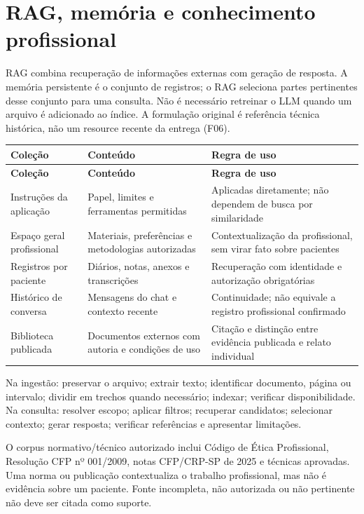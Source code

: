 \documentclass[11pt,a4paper]{article}
\begin{document}
\section{RAG, memória e conhecimento profissional}
RAG combina recuperação de informações externas com geração de resposta. A memória persistente é o conjunto de registros; o RAG seleciona partes pertinentes desse conjunto para uma consulta. Não é necessário retreinar o LLM quando um arquivo é adicionado ao índice. A formulação original é referência técnica histórica, não um resource recente da entrega (F06).

\begingroup\small
\begin{longtable}{>{\raggedright\arraybackslash}p{}>{\raggedright\arraybackslash}p{}>{\raggedright\arraybackslash}p{}}
\toprule
\textbf{Coleção} & \textbf{Conteúdo} & \textbf{Regra de uso} \\ \midrule\endfirsthead
\toprule
\textbf{Coleção} & \textbf{Conteúdo} & \textbf{Regra de uso} \\ \midrule\endhead
\bottomrule\endfoot
Instruções da aplicação & Papel, limites e ferramentas permitidas & Aplicadas diretamente; não dependem de busca por similaridade \\[3pt]
Espaço geral profissional & Materiais, preferências e metodologias autorizadas & Contextualização da profissional, sem virar fato sobre pacientes \\[3pt]
Registros por paciente & Diários, notas, anexos e transcrições & Recuperação com identidade e autorização obrigatórias \\[3pt]
Histórico de conversa & Mensagens do chat e contexto recente & Continuidade; não equivale a registro profissional confirmado \\[3pt]
Biblioteca publicada & Documentos externos com autoria e condições de uso & Citação e distinção entre evidência publicada e relato individual \\[3pt]
\end{longtable}
\endgroup
Na ingestão: preservar o arquivo; extrair texto; identificar documento, página ou intervalo; dividir em trechos quando necessário; indexar; verificar disponibilidade. Na consulta: resolver escopo; aplicar filtros; recuperar candidatos; selecionar contexto; gerar resposta; verificar referências e apresentar limitações.

O corpus normativo/técnico autorizado inclui Código de Ética Profissional, Resolução CFP nº 001/2009, notas CFP/CRP-SP de 2025 e técnicas aprovadas. Uma norma ou publicação contextualiza o trabalho profissional, mas não é evidência sobre um paciente. Fonte incompleta, não autorizada ou não pertinente não deve ser citada como suporte.
\end{document}
